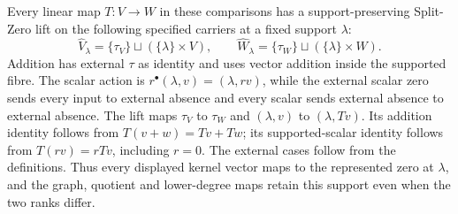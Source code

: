 Every linear map \(T:V\to W\) in these comparisons has a
support-preserving Split-Zero lift on the following specified
carriers at a fixed support \(\lambda\):
\[
 \widehat V_\lambda=\{\tau_V\}\sqcup(\{\lambda\}\times V),
 \qquad \widehat W_\lambda=\{\tau_W\}\sqcup(\{\lambda\}\times W).
\]
Addition has external \(\tau\) as identity and uses vector
addition inside the supported fibre.  The scalar action is
\(r^\bullet(\lambda,v)=(\lambda,rv)\), while the external
scalar zero sends every input to external absence and every
scalar sends external absence to external absence.  The lift
maps \(\tau_V\) to \(\tau_W\) and
\((\lambda,v)\) to \((\lambda,Tv)\).  Its addition
identity follows from \(T(v+w)=Tv+Tw\); its supported-scalar
identity follows from \(T(rv)=rTv\), including \(r=0\).
The external cases follow from the definitions.  Thus every
displayed kernel vector maps to the represented zero at
\(\lambda\), and the graph, quotient and lower-degree maps
retain this support even when the two ranks differ.
